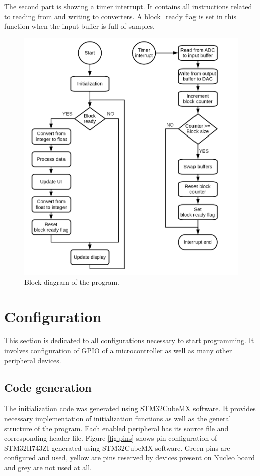 \documentclass[a4paper,twoside,12pt]{book}
\begin{document}
The second part is showing a timer interrupt.
It contains all instructions related
to reading from and writing to converters.
A block\_ready flag is set in this function
when the input buffer is full of samples.

\newpage

\begin{figure}[H]
    \centering
    \includegraphics[width=\textwidth]{images/Block2}
    \caption{Block diagram of the program.}
    \label{fig:block2}
\end{figure}

\section{Configuration}
This section is dedicated to all configurations necessary to start programming.
It involves configuration of GPIO of a microcontroller as well as
many other peripheral devices.

\subsection{Code generation}

The initialization code was generated using STM32CubeMX software.
It provides necessary implementation of initialization functions
as well as the general structure of the program.
Each enabled peripheral has its source file
and corresponding header file.
Figure \ref{fig:pins} shows pin configuration of STM32H743ZI
generated using STM32CubeMX software.
Green pins are configured and used, yellow are pins reserved by
devices present on Nucleo board and grey are not used at all.
\end{document}
